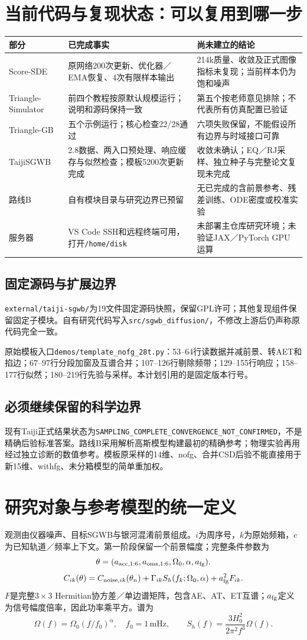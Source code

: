 \documentclass[UTF8,fontset=none,a4paper,11pt]{ctexart}
\newcommand{\code}[1]{\texttt{\nolinkurl{#1}}}
\begin{document}
\section{当前代码与复现状态：可以复用到哪一步}
\begin{longtable}{p{29mm}p{62mm}p{59mm}}\toprule
部分 & 已完成事实 & 尚未建立的结论\\\midrule
Score-SDE & 原网络200次更新、优化器／EMA恢复、4次有限样本输出 & 214k质量、收敛及正式图像指标未复现；当前样本仍为饱和噪声\\
Triangle-Simulator & 前四个教程按原默认规模运行；说明和源码保持一致 & 第五个按老师意见排除；不代表所有仿真配置已验证\\
Triangle-GB & 五个示例运行；核心检查22/28通过 & 六项失败保留，不能假设所有边界与时域接口可靠\\
TaijiSGWB & 2.8数据、两入口预处理、响应缓存与似然检查；模板5200次更新完成 & 收敛未确认；EQ／RJ采样、独立种子与完整论文复现未完成\\
路线B & 自有模块目录与研究边界已预留 & 无已完成的含前景参考、残差训练、ODE密度或校准实验\\
服务器 & VS Code SSH和远程终端可用，打开\code{/home/disk} & 未部署主仓库研究环境；未验证JAX／PyTorch GPU运算\\\bottomrule
\end{longtable}
\subsection{固定源码与扩展边界}
\code{external/taiji-sgwb/}为19文件固定源码快照，保留GPL许可；其他复现组件保留固定子模块。自有研究代码写入\code{src/sgwb_diffusion/}，不修改上游后仍声称原代码完全一致。

原始模板入口\code{demos/template_nofg_28t.py}：53--64行读数据并减前景、转AET和掐边；67--97行分段加窗及互谱合并；107--126行剔除频带；129--155行响应；158--177行似然；180--219行先验与采样。本计划引用的是固定版本行号。
\subsection{必须继续保留的科学边界}
现有Taiji正式结果状态为\code{SAMPLING_COMPLETE_CONVERGENCE_NOT_CONFIRMED}，不是精确后验标准答案。路线B采用解析高斯模型构建最初的精确参考；物理实验再用经过独立诊断的数值参考。模板原采样的14维、nofg、合并CSD后验不能直接用于新15维、withfg、未分箱模型的简单重加权。
\clearpage

\section{研究对象与参考模型的统一定义}
观测由仪器噪声、目标SGWB与银河混淆前景组成。$i$为周序号，$k$为原始频箱，$c$为已知轨道／频率上下文。第一阶段保留一个前景幅度；完整条件参数为
\[
\theta=(a_{{\rm acc},1:6},a_{{\rm oms},1:6},\Omega_0,\alpha,a_{\rm fg}).
\]
\[
C_{ik}(\theta)=C_{{\rm noise},ik}(\theta_n)
 +\Gamma_{ik}S_h(f_k;\Omega_0,\alpha)+a_{\rm fg}^2F_{ik}.
\]
$F$是完整$3\times3$ Hermitian协方差／单边谱矩阵，包含AE、AT、ET互谱；$a_{\rm fg}$定义为信号幅度倍率，因此功率乘平方。谱为
\[
\Omega(f)=\Omega_0(f/f_0)^\alpha,\quad f_0=1\,\mathrm{mHz},\qquad
S_h(f)=\frac{3H_0^2}{2\pi^2f^3}\Omega(f).
\]
\end{document}
